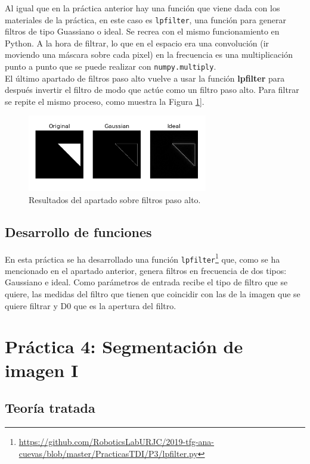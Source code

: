 Al igual que en la práctica anterior hay una función que viene dada con los materiales de la práctica, en este caso es  \texttt{lpfilter}, una función para generar filtros de tipo Guassiano o ideal. Se recrea con el mismo funcionamiento en Python. A la hora de filtrar, lo que en el espacio era una convolución (ir moviendo una máscara sobre cada pixel) en la frecuencia es una multiplicación punto a punto que se puede realizar con \texttt{numpy.multiply}.\\

El último apartado de filtros paso alto vuelve a usar la función \textbf{lpfilter} para después invertir el filtro de modo que actúe como un filtro paso alto. Para filtrar se repite el mismo proceso, como muestra la Figura \ref{fpa}].

\begin{figure}[h]
\centering
\includegraphics[width=0.7\textwidth]{imagenes/fpa}
\caption{Resultados del apartado sobre filtros paso alto.}
\label{fpa}
\end{figure}

\subsection{Desarrollo de funciones}

En esta práctica se ha desarrollado una función \texttt{lpfilter}\footnote{\url{https://github.com/RoboticsLabURJC/2019-tfg-ana-cuevas/blob/master/PracticasTDI/P3/lpfilter.py}} que, como se ha mencionado en el apartado anterior, genera filtros en frecuencia de dos tipos: Gaussiano e ideal. Como parámetros de entrada recibe el tipo de filtro que se quiere, las medidas del filtro que tienen que coincidir con las de la imagen que se quiere filtrar y D0 que es la apertura del filtro.\\

\section{ Práctica 4: Segmentación de imagen I}
\subsection{Teoría tratada}

